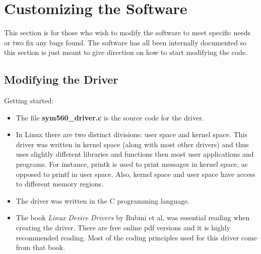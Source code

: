 \documentclass[11pt]{article}
\begin{document}




\section{Customizing the Software} \label{customizing}
This section is for those who wish to modify the software to meet specific needs or two fix any bugs found.  The software has all been internally documented so this section is just meant to give direction on how to start modifying the code.

\subsection{Modifying the Driver} \label{moddriver}
Getting started:
\begin{itemize}
\item The file \textbf{sym560\_driver.c} is the source code for the driver.
\item In Linux there are two distinct divisions: user space and kernel space.  This driver was written in kernel space (along with most other drivers) and thus uses slightly different libraries and functions then most user applications and programs.  For instance, printk is used to print messages in kernel space, as opposed to printf in user space.  Also, kernel space and user space have access to different memory regions.
\item The driver was written in the C programming language.
\item The book \textit{Linux Device Drivers} by Rubini et al, was essential reading when creating the driver.  There are free online pdf versions  and it is highly recommended reading.  Most of the coding principles used for this driver come from that book.
\end{itemize}
\end{document}
